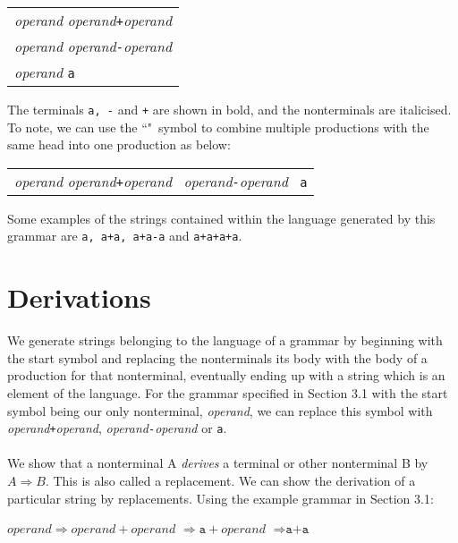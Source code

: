 \documentclass[a4paper, 11pt]{article}
\begin{document}
\begin{center}
	\begin{tabular}{l}
		\textit{operand} \textbf{\textrightarrow} \textit{operand}\texttt{+}\textit{operand} \\
		\textit{operand} \textbf{\textrightarrow} \textit{operand}\texttt{-}\textit{operand} \\
		\textit{operand} \textbf{\textrightarrow} \texttt{a}
	\end{tabular}
\end{center}

The terminals \texttt{a, -} and \texttt{+} are shown in bold, and the nonterminals are italicised. To note, we can use the ``\textbar"\ symbol to combine multiple productions with the same head into one production as below:

\begin{center}
	\begin{tabular}{l}
		\textit{operand} \textbf{\textrightarrow} \textit{operand}\texttt{+}\textit{operand} \textbar\ \textit{operand}\texttt{-}\textit{operand} \textbar\ \texttt{a}
	\end{tabular}
\end{center}

Some examples of the strings contained within the language generated by this grammar are \texttt{a, a+a, a+a-a} and \texttt{a+a+a+a}. 

\newpage
\section{Derivations}
We generate strings belonging to the language of a grammar by beginning with the start symbol and replacing the nonterminals its body with the body of a production for that nonterminal, eventually ending up with a string which is an element of the language. For the grammar specified in Section 3.1 with the start symbol being our only nonterminal, \textit{operand}, we can replace this symbol with \textit{operand}\texttt{+}\textit{operand}, \textit{operand}\texttt{-}\textit{operand} or \texttt{a}.
\\\\
We show that a nonterminal A \textit{derives} a terminal or other nonterminal B by $A \Rightarrow B$. This is also called a replacement. We can show the derivation of a particular string by replacements. Using the example grammar in Section 3.1:

\begin{center}
	$operand \Rightarrow operand+operand$ $\Rightarrow \texttt{a}+operand$ $\Rightarrow \texttt{a+a}$
\end{center}
\end{document}
